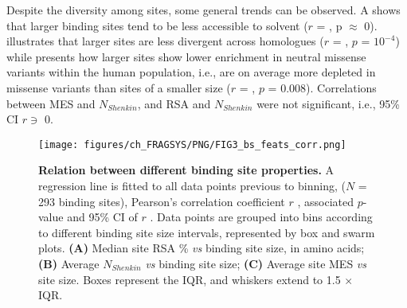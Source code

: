 Despite the diversity among sites, some general trends can be observed. A shows that larger binding sites tend to be less accessible to solvent ($r$ = , p $\approx$ 0).  illustrates that larger sites are less divergent across homologues ($r$ = , $p$ = $10^{-4}$) while  presents how larger sites show lower enrichment in neutral missense variants within the human population, i.e., are on average more depleted in missense variants than sites of a smaller size ($r$ = , $p$ = 0.008). Correlations between MES and $N_{Shenkin}$, and RSA and $N_{Shenkin}$ were not significant, i.e., 95\% CI $r \ni$ 0.

\begin{figure}[ht!]
    \centering
    \texttt{[image: figures/ch\_FRAGSYS/PNG/FIG3\_bs\_feats\_corr.png]}
    \caption[Relation between different binding site properties]{\textbf{Relation between different binding site properties.} A regression line is fitted to all data points previous to binning, ($N$ = 293 binding sites), Pearson’s correlation coefficient $r$ \cite{RODGERS_1988_CORRELATION}, associated $p$-value and 95\% CI of $r$ \cite{BOWLEY_1928_R_CI}. Data points are grouped into bins according to different binding site size intervals, represented by box and swarm plots. \textbf{(A)} Median site RSA \% \textit{vs} binding site size, in amino acids; \textbf{(B)} Average $N_{Shenkin}$ \textit{vs} binding site size; \textbf{(C)} Average site MES \textit{vs} site size. Boxes represent the IQR, and whiskers extend to 1.5 $\times$ IQR.}
    \label{fig:bss_feats_corr}
\end{figure}


